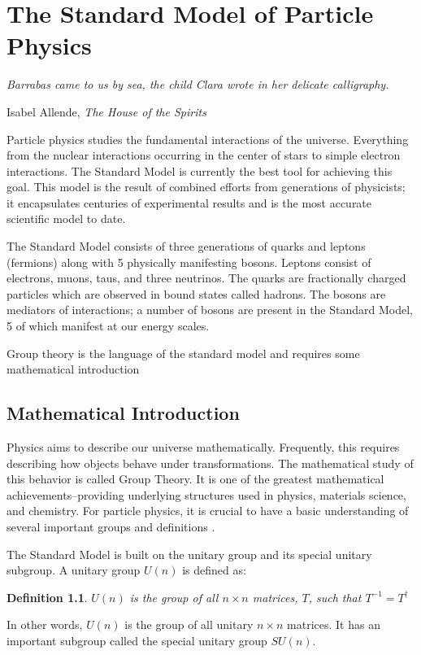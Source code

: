 \chapter{The Standard Model of Particle Physics }
\epigraph{\itshape Barrabas came to us by sea, the child Clara wrote in her delicate calligraphy.}{Isabel Allende, \textit{The House of the Spirits} }

\linenumbers

Particle physics studies the fundamental interactions of the universe. Everything from the nuclear interactions occurring in the center of stars to simple electron interactions. The Standard Model is currently the best tool for achieving this goal. This model is the result of combined efforts from generations of physicists; it encapsulates centuries of experimental results and is the most accurate scientific model to date.

The Standard Model consists of three generations of quarks and leptons (fermions) along with 5 physically manifesting bosons. Leptons consist of electrons, muons, taus, and three neutrinos. The quarks are fractionally charged particles which are observed in bound states called hadrons. The bosons are mediators of interactions; a number of bosons are present in the Standard Model, 5 of which manifest at our energy scales.

Group theory is the language of the standard model and requires some mathematical introduction

\section{Mathematical Introduction}

Physics aims to describe our universe mathematically. Frequently, this requires describing how objects behave under transformations. The mathematical study of this behavior is called Group Theory. It is one of the greatest mathematical achievements--providing underlying structures used in physics, materials science, and chemistry. For particle physics, it is crucial to have a basic understanding of several important groups and definitions \cite{GroupTheoryBook}.

The Standard Model is built on the unitary group and its special unitary subgroup. A unitary group $U(n)$ is defined as:

\newtheorem{theorem}{Theorem}[section]
\newtheorem{definition}[theorem]{Definition}

\begin{definition}
$U(n)$ is the group of all $n \times n$ matrices, $T$, such that $T^{-1}=T^{\dagger}$  
\end{definition}
In other words, $U(n)$ is the group of all unitary $n \times n$ matrices. It has an important subgroup called the special unitary group $SU(n)$.

